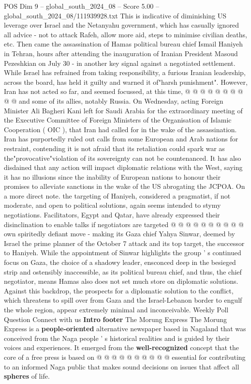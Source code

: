 \begin{textsample}{POS Dim 9 – global\_south\_2024\_08 – Score 5.00 – global\_south\_2024\_08/111939928.txt}
This is indicative of diminishing US leverage over Israel and the Netanyahu government, which has casually ignored all advice - not to attack Rafeh, allow more aid, steps to minimise civilian deaths, etc.
Then came the assassination of Hamas political bureau chief Ismail Haniyeh in Tehran, hours after attending the inauguration of Iranian President Masoud Pezeshkian on July 30 - in another key signal against a negotiated settlement.
While Israel has refrained from taking responsibility, a furious Iranian leadership, across the board, has held it guilty and warned it of"harsh punishment".
However, Iran has not acted so far, and seemed focussed, at this time, @ @ @ @ @ @ @ @ @ @ and some of its allies, notably Russia.
On Wednesday, acting Foreign Minister Ali Bagheri Kani left for Saudi Arabia for the extraordinary meeting of the Executive Committee of Foreign Ministers of the Organisation of Islamic Cooperation ( OIC ), that Iran had called for in the wake of the assassination.
Iran has purportedly ruled out calls from some European and Arab nations for restraint, contending it is not afraid that its retaliation could spark war as the"provocative"violation of its sovereignty can not be countenanced.
It has also disdained that any action will impact diplomatic relations with the West, saying it has no illusions since the inability of European nations to honour their promises to alleviate sanctions in the wake of the US abrogating the JCPOA.
On a more direct note. the targeting of Haniyeh, considered a pragmatist, if not moderate, and open to political solutions, again seems intended to stymy negotiations.
Facilitators, Egypt and Qatar, have already expressed their disinclination to enable talks if negotiators are targeted @ @ @ @ @ @ @ @ @ @ own spiritedly defiant move - making its Gaza chief Yahya Sinwar, deemed by Israel the prime planner of the October 7 attack and its top target, the successor to Haniyeh.
While the appointment of Sinwar highlights the group ' s continued focus on Gaza, the choice of a shadowy leader, ensconced deep in the besieged strip and ostensibly inaccessible, as its political bureau chief, and thus, the chief negotiator, means Hamas also does not set much store on diplomatic solutions.
Against this backdrop, the prospects for a diplomatic solution to the conflict, which threatens to spill over from Gaza and the Israel-Lebanon border to engulf the whole region, appear extremely minimal and inconceivable.
Weekly Poll Question Connect with us \textbf{Intro} \textbf{footer} The Morung Express The Morung Express is a \textbf{people-oriented} alternative newspaper based in Nagaland that was conceived from the Naga people ' s historical realities and is guided by their voices and experiences.
It emerged from the \textbf{well-recognized} concept that the core of a free press is based on @ @ @ @ @ @ @ @ @ @ essential for contributing to an informed Naga public that makes sound decisions on issues that affect all \textbf{spheres} of life.

\end{textsample}

